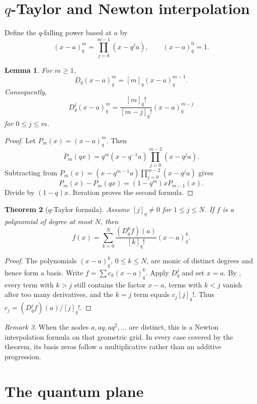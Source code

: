\documentclass[11pt,oneside,openany]{book}
\newtheorem{theorem}{Theorem}[chapter]
\newtheorem{lemma}[theorem]{Lemma}
\theoremstyle{definition}
\theoremstyle{remark}
\newtheorem{remark}[theorem]{Remark}
\begin{document}
\section{\texorpdfstring{$q$}{q}-Taylor and Newton interpolation}

Define the $q$-falling power based at $a$ by
\[
 (x-a)_q^m=\prod_{j=0}^{m-1}(x-q^ja),
 \qquad (x-a)_q^0=1.
\]

\begin{lemma}\label{lem:qfalling-derivative}
For $m\ge1$,
\[
 D_q(x-a)_q^m=[m]_q(x-a)_q^{m-1}.
\]
Consequently,
\[
 D_q^j(x-a)_q^m
 =\frac{[m]_q!}{[m-j]_q!}(x-a)_q^{m-j}
\]
for $0\le j\le m$.
\end{lemma}

\begin{proof}
Let $P_m(x)=(x-a)_q^m$.  Then
\[
 P_m(qx)=q^m(x-q^{-1}a)\prod_{j=0}^{m-2}(x-q^ja).
\]
Subtracting from
\(
 P_m(x)=(x-q^{m-1}a)\prod_{j=0}^{m-2}(x-q^ja)
\)
gives
\[
 P_m(x)-P_m(qx)=(1-q^m)xP_{m-1}(x).
\]
Divide by $(1-q)x$.  Iteration proves the second formula.
\end{proof}

\begin{theorem}[$q$-Taylor formula]\label{thm:q-taylor}
Assume $[j]_q\ne0$ for $1\le j\le N$.  If $f$ is a polynomial of degree at most $N$, then
\[
 f(x)=\sum_{k=0}^{N}\frac{(D_q^kf)(a)}{[k]_q!}(x-a)_q^k.
\]
\end{theorem}

\begin{proof}
The polynomials $(x-a)_q^k$, $0\le k\le N$, are monic of distinct degrees and hence form a basis.  Write
\(
 f=\sum c_k(x-a)_q^k.
\)
Apply $D_q^j$ and set $x=a$.  By , every term with $k>j$ still contains the factor $x-a$, terms with $k<j$ vanish after too many derivatives, and the $k=j$ term equals $c_j[j]_q!$.  Thus $c_j=(D_q^jf)(a)/[j]_q!$.
\end{proof}

\begin{remark}
When the nodes $a,aq,aq^2,\ldots$ are distinct, this is a Newton interpolation formula on that geometric grid.  In every case covered by the theorem, its basis zeros follow a multiplicative rather than an additive progression.
\end{remark}

\section{The quantum plane}
\end{document}
